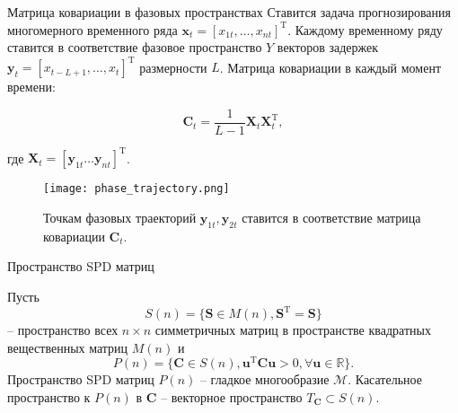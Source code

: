 \documentclass{beamer}
\begin{document}
\begin{frame}{Матрица ковариации в фазовых пространствах}
\small
Ставится задача прогнозирования многомерного временного ряда $\mathbf{x}_t = [x_{1t}, \ldots, x_{nt}]^{\text{T}}$. Каждому временному ряду ставится в соответствие фазовое пространство $Y$ векторов задержек $\mathbf{y}_t = [x_{t - L + 1}, \ldots, x_{t}]^{\text{T}}$ размерности $L$. Матрица ковариации в каждый момент времени:

\begin{equation*}
    \mathbf{C}_t = \dfrac{1}{L - 1}\mathbf{X}_t\mathbf{X}_t^{\text{T}},
\end{equation*}

где $\mathbf{X}_t = [\mathbf{y}_{1t} \ldots \mathbf{y}_{nt}]^{\text{T}}$.

\begin{figure}[h]
  \begin{minipage}{0.4\textwidth}
    \texttt{[image: phase\_trajectory.png]}
  
  \end{minipage}\hfill
  \caption*{Точкам фазовых траекторий $\mathbf{y}_{1t}, \mathbf{y}_{2t}$ ставится в соответствие матрица ковариации $\mathbf{C}_t$.}
\end{figure}
\end{frame}
\begin{frame}{Пространство SPD матриц}
\small

Пусть \[S(n) = \{\mathbf{S} \in M(n), \mathbf{S}^{\text{T}} = \mathbf{S}\}\] -- пространство всех $n \times n$ симметричных матриц в пространстве квадратных вещественных матриц $M(n)$ и \[P(n) = \{\mathbf{C} \in S(n), \mathbf{u}^{\text{T}}\mathbf{C}\mathbf{u} > 0, \forall \mathbf{u} \in \mathds{R}\}.\]
Пространство SPD матриц $P(n)$ -- гладкое многообразие $\mathcal{M}$. Касательное пространство к $P(n)$ в $\mathbf{C}$ -- векторное пространство $T_{\mathbf{C}} \subset S(n)$.


\end{frame}
\end{document}
